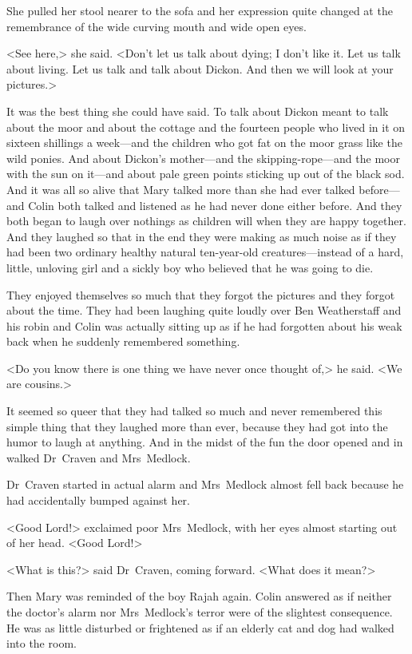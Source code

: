She pulled her stool nearer to the sofa and her expression quite changed at the remembrance of the wide curving mouth and wide open eyes.

<See here,> she said. <Don't let us talk about dying; I don't like it. Let us talk about living. Let us talk and talk about Dickon. And then we will look at your pictures.>

It was the best thing she could have said. To talk about Dickon meant to talk about the moor and about the cottage and the fourteen people who lived in it on sixteen shillings a week—and the children who got fat on the moor grass like the wild ponies. And about Dickon's mother—and the skipping-rope—and the moor with the sun on it—and about pale green points sticking up out of the black sod. And it was all so alive that Mary talked more than she had ever talked before—and Colin both talked and listened as he had never done either before. And they both began to laugh over nothings as children will when they are happy together. And they laughed so that in the end they were making as much noise as if they had been two ordinary healthy natural ten-year-old creatures—instead of a hard, little, unloving girl and a sickly boy who believed that he was going to die.

They enjoyed themselves so much that they forgot the pictures and they forgot about the time. They had been laughing quite loudly over Ben Weatherstaff and his robin and Colin was actually sitting up as if he had forgotten about his weak back when he suddenly remembered something.

<Do you know there is one thing we have never once thought of,> he said. <We are cousins.>

It seemed so queer that they had talked so much and never remembered this simple thing that they laughed more than ever, because they had got into the humor to laugh at anything. And in the midst of the fun the door opened and in walked Dr~Craven and Mrs~Medlock.

Dr~Craven started in actual alarm and Mrs~Medlock almost fell back because he had accidentally bumped against her.

<Good Lord!> exclaimed poor Mrs~Medlock, with her eyes almost starting out of her head. <Good Lord!>

<What is this?> said Dr~Craven, coming forward. <What does it mean?>

Then Mary was reminded of the boy Rajah again. Colin answered as if neither the doctor's alarm nor Mrs~Medlock's terror were of the slightest consequence. He was as little disturbed or frightened as if an elderly cat and dog had walked into the room.


